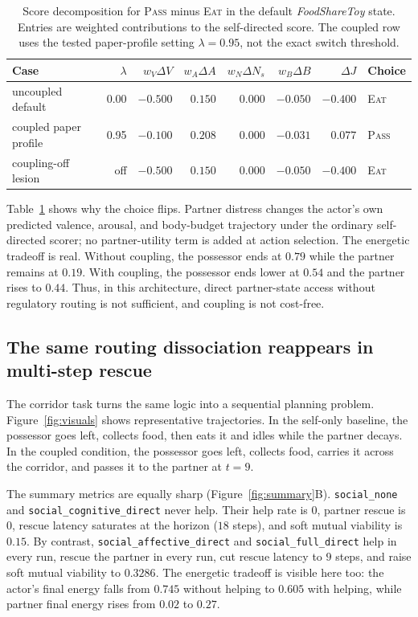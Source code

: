 \documentclass[letterpaper]{article}
\begin{document}
\begin{table}[t]
\centering
\small
\begin{tabular}{@{}lrrrrrrl@{}}
\toprule
Case & $\lambda$ & $w_V\Delta V$ & $w_A\Delta A$ & $w_N\Delta N_s$ & $w_B\Delta B$ & $\Delta J$ & Choice \\
\midrule
uncoupled default & 0.00 & $-0.500$ & $0.150$ & $0.000$ & $-0.050$ & $-0.400$ & \textsc{Eat} \\
coupled paper profile & 0.95 & $-0.100$ & $0.208$ & $0.000$ & $-0.031$ & $0.077$ & \textsc{Pass} \\
coupling-off lesion & off & $-0.500$ & $0.150$ & $0.000$ & $-0.050$ & $-0.400$ & \textsc{Eat} \\
\bottomrule
\end{tabular}
\caption{Score decomposition for \textsc{Pass} minus \textsc{Eat} in the default \emph{FoodShareToy} state. Entries are weighted contributions to the self-directed score. The coupled row uses the tested paper-profile setting $\lambda=0.95$, not the exact switch threshold.}
\label{tab:scoredecomp}
\end{table}

Table~\ref{tab:scoredecomp} shows why the choice flips. Partner distress changes the actor's own predicted valence, arousal, and body-budget trajectory under the ordinary self-directed scorer; no partner-utility term is added at action selection. The energetic tradeoff is real. Without coupling, the possessor ends at $0.79$ while the partner remains at $0.19$. With coupling, the possessor ends lower at $0.54$ and the partner rises to $0.44$. Thus, in this architecture, direct partner-state access without regulatory routing is not sufficient, and coupling is not cost-free.

\subsection{The same routing dissociation reappears in multi-step rescue}

The corridor task turns the same logic into a sequential planning problem. Figure~\ref{fig:visuals} shows representative trajectories. In the self-only baseline, the possessor goes left, collects food, then eats it and idles while the partner decays. In the coupled condition, the possessor goes left, collects food, carries it across the corridor, and passes it to the partner at $t=9$.


The summary metrics are equally sharp (Figure~\ref{fig:summary}B). \texttt{social\_none} and \texttt{social\_cognitive\_direct} never help. Their help rate is $0$, partner rescue is $0$, rescue latency saturates at the horizon ($18$ steps), and soft mutual viability is $0.15$. By contrast, \texttt{social\_affective\_direct} and \texttt{social\_full\_direct} help in every run, rescue the partner in every run, cut rescue latency to $9$ steps, and raise soft mutual viability to $0.3286$. The energetic tradeoff is visible here too: the actor's final energy falls from $0.745$ without helping to $0.605$ with helping, while partner final energy rises from $0.02$ to $0.27$.
\end{document}
